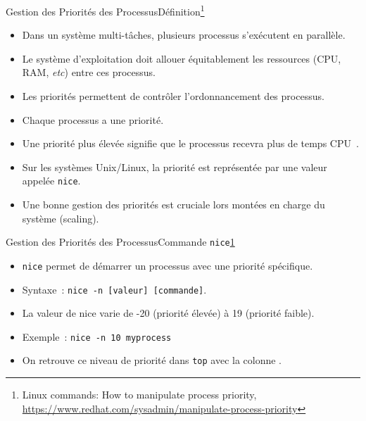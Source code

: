 \documentclass{beamer}
\begin{document}
    \begin{frame}{Gestion des Priorités des Processus}{Définition\footnote{\label{process-priority}Linux commands: How to manipulate process priority, \url{https://www.redhat.com/sysadmin/manipulate-process-priority}}}
        \begin{itemize}
            \item Dans un système multi-tâches, plusieurs processus s'exécutent en parallèle.
            \item Le système d'exploitation doit allouer équitablement les ressources (CPU, RAM, \textit{etc}) entre ces processus.
            \item Les priorités permettent de contrôler l'ordonnancement des processus.
            \item Chaque processus a une priorité.
            \item Une priorité plus élevée signifie que le processus recevra plus de temps CPU~.
            \item Sur les systèmes Unix/Linux, la priorité est représentée par une valeur appelée \lstinline{nice}.
            \item Une bonne gestion des priorités est cruciale lors montées en charge du système (scaling).
        \end{itemize}
    \end{frame}

    \begin{frame}{Gestion des Priorités des Processus}{Commande \lstinline{nice}\cref{process-priority}}
        \begin{itemize}
            \item \lstinline{nice} permet de démarrer un processus avec une priorité spécifique.
            \item Syntaxe~: \lstinline{nice -n [valeur] [commande]}.
            \item La valeur de nice varie de -20 (priorité élevée) à 19 (priorité faible).
            \item Exemple~: \lstinline{nice -n 10 myprocess}
            \item On retrouve ce niveau de priorité dans \lstinline{top} avec la colonne .
        \end{itemize}
    \end{frame}
\end{document}

